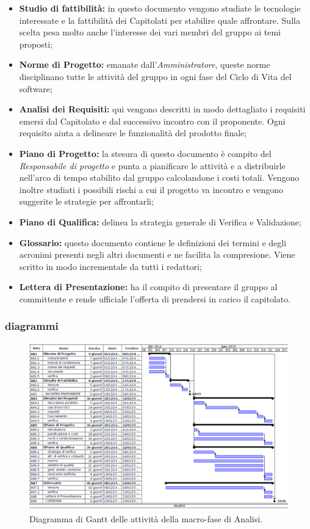 \begin{itemize}
\item \textbf{Studio di fattibilità:} in questo documento vengono studiate le tecnologie interessate e la fattibilità dei Capitolati per stabilire quale affrontare. Sulla scelta pesa molto anche l'interesse dei vari membri del gruppo ai temi proposti;
\item \textbf{Norme di Progetto:} emanate dall'\textit{Amministratore}, queste norme disciplinano tutte le attività del gruppo in ogni fase del Ciclo di Vita del software;
\item \textbf{Analisi dei Requisiti:} qui vengono descritti in modo dettagliato i requisiti emersi dal Capitolato e dal successivo incontro con il proponente. Ogni requisito aiuta a delineare le funzionalità del prodotto finale;
\item \textbf{Piano di Progetto:} la stesura di questo documento è compito del \textit{Responsabile di progetto} e punta a pianificare le attività e a distribuirle nell'arco di tempo stabilito dal gruppo calcolandone i costi totali. Vengono inoltre studiati i possibili rischi a cui il progetto va incontro e vengono suggerite le strategie per affrontarli;
\item \textbf{Piano di Qualifica:} delinea la strategia generale di Verifica e Validazione;
\item \textbf{Glossario:} questo documento contiene le definizioni dei termini e degli acronimi presenti negli altri documenti e ne facilita la compresione. Viene scritto in modo incrementale da tutti i redattori;
\item \textbf{Lettera di Presentazione:} ha il compito di presentare il gruppo al committente e rende ufficiale l'offerta di prendersi in carico il capitolato.
\end{itemize}

\newpage
\subsubsection{diagrammi}

\begin{figure}[h]
\begin{center}
\includegraphics[width=\textwidth, height=\textheight, keepaspectratio]{img/analisi-gantt.png}
\caption{Diagramma di Gantt delle attività della macro-fase di Analisi.}
\end{center}
\end{figure}
\clearpage

